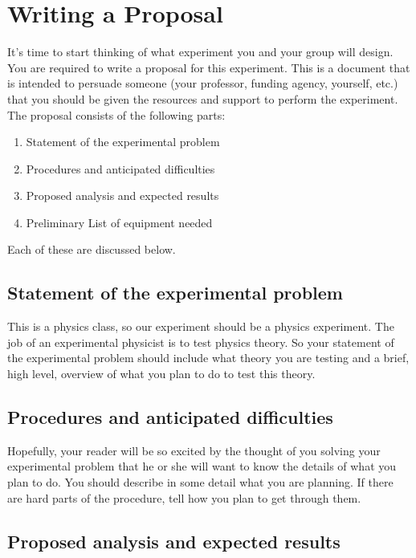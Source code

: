 
\chapter{Writing a Proposal}

It's time to start thinking of what experiment you and your group will
design. You are required to write a proposal for this experiment. This is
a document that is intended to persuade someone (your professor, funding
agency, yourself, etc.) that you should be given the resources and support
to perform the experiment. The proposal consists of the following parts:

\begin{enumerate}
\item Statement of the experimental problem

\item Procedures and anticipated difficulties

\item Proposed analysis and expected results

\item Preliminary List of equipment needed
\end{enumerate}

Each of these are discussed below.

\section{Statement of the experimental problem}

This is a physics class, so our experiment should be a physics experiment.
The job of an experimental physicist is to test physics theory. So your
statement of the experimental problem should include what theory you are
testing and a brief, high level, overview of what you plan to do to test
this theory.

\section{Procedures and anticipated difficulties}

Hopefully, your reader will be so excited by the thought of you solving your
experimental problem that he or she will want to know the details of what
you plan to do. You should describe in some detail what you are planning. If
there are hard parts of the procedure, tell how you plan to get through them.

\section{Proposed analysis and expected results}

